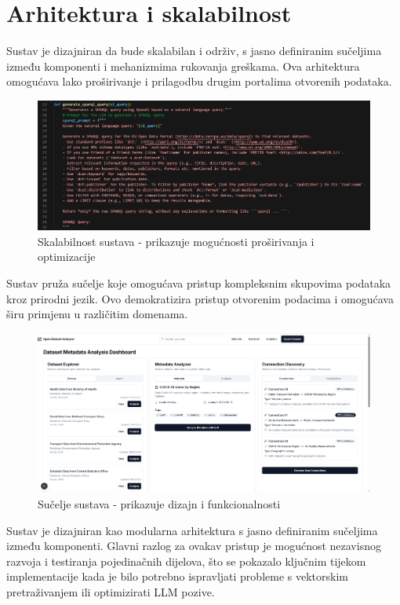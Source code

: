 \section{Arhitektura i skalabilnost}

Sustav je dizajniran da bude skalabilan i održiv, s jasno definiranim sučeljima između komponenti i mehanizmima rukovanja greškama. Ova arhitektura omogućava lako proširivanje i prilagodbu drugim portalima otvorenih podataka.

\begin{figure}[htbp]
    \centering
    \includegraphics[width=1\textwidth]{figures/izvjestaj_image_13.png}
    \caption{Skalabilnost sustava - prikazuje mogućnosti proširivanja i optimizacije}
    \label{fig:system_scalability}
\end{figure}

Sustav pruža sučelje koje omogućava pristup kompleksnim skupovima podataka kroz prirodni jezik. Ovo demokratizira pristup otvorenim podacima i omogućava širu primjenu u različitim domenama.

\begin{figure}[htbp]
    \centering
    \includegraphics[width=1\textwidth]{figures/izvjestaj_image_4.png}
    \caption{Sučelje sustava - prikazuje dizajn i funkcionalnosti}
    \label{fig:user_interface}
\end{figure}

Sustav je dizajniran kao modularna arhitektura s jasno definiranim sučeljima između komponenti. Glavni razlog za ovakav pristup je mogućnost nezavisnog razvoja i testiranja pojedinačnih dijelova, što se pokazalo ključnim tijekom implementacije kada je bilo potrebno ispravljati probleme s vektorskim pretraživanjem ili optimizirati LLM pozive.

